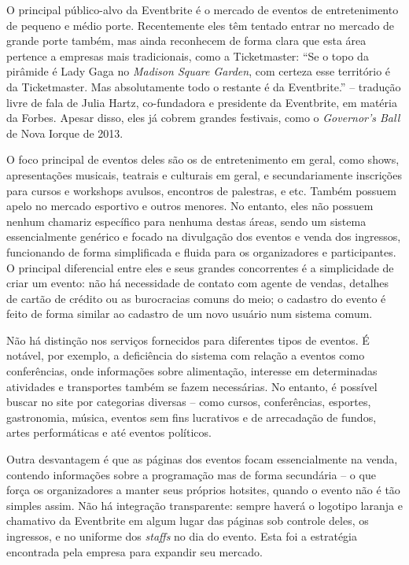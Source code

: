\documentclass[12pt,a4paper,twoside,hyphens,english,brazil]{abntex2}
\begin{document}
O principal público-alvo da Eventbrite é o mercado de eventos de entretenimento de pequeno e médio porte. Recentemente eles têm tentado entrar no mercado de grande porte também, mas ainda reconhecem de forma clara que esta área pertence a empresas mais tradicionais, como a Ticketmaster: ``Se o topo da pirâmide é Lady Gaga no \emph{Madison Square Garden}, com certeza esse território é da Ticketmaster. Mas absolutamente todo o restante é da Eventbrite.'' -- tradução livre de fala de Julia Hartz, co-fundadora e presidente da Eventbrite, em matéria da Forbes\cite{eventbrite-lucro-forbes}. Apesar disso, eles já cobrem grandes festivais, como o \emph{Governor's Ball} de Nova Iorque de 2013.\cite{eventbrite-lucro-forbes}

O foco principal de eventos deles são os de entretenimento em geral, como shows, apresentações musicais, teatrais e culturais em geral, e secundariamente inscrições para cursos e workshops avulsos, encontros de palestras, e etc. Também possuem apelo no mercado esportivo e outros menores. No entanto, eles não possuem nenhum chamariz específico para nenhuma destas áreas, sendo um sistema essencialmente genérico e focado na divulgação dos eventos e venda dos ingressos, funcionando de forma simplificada e fluida para os organizadores e participantes. O principal diferencial entre eles e seus grandes concorrentes é a simplicidade de criar um evento: não há necessidade de contato com agente de vendas, detalhes de cartão de crédito ou as burocracias comuns do meio; o cadastro do evento é feito de forma similar ao cadastro de um novo usuário num sistema comum.

Não há distinção nos serviços fornecidos para diferentes tipos de eventos. É notável, por exemplo, a deficiência do sistema com relação a eventos como conferências, onde informações sobre alimentação, interesse em determinadas atividades e transportes também se fazem necessárias\cite{eventbrite-review}. No entanto, é possível buscar no site por categorias diversas -- como cursos, conferências, esportes, gastronomia, música, eventos sem fins lucrativos e de arrecadação de fundos, artes performáticas e até eventos políticos.

Outra desvantagem é que as páginas dos eventos focam essencialmente na venda, contendo informações sobre a programação mas de forma secundária -- o que força os organizadores a manter seus próprios hotsites, quando o evento não é tão simples assim. Não há integração transparente: sempre haverá o logotipo laranja e chamativo da Eventbrite em algum lugar das páginas sob controle deles, os ingressos, e no uniforme dos \emph{staffs} no dia do evento. Esta foi a estratégia encontrada pela empresa para expandir seu mercado.
\end{document}
